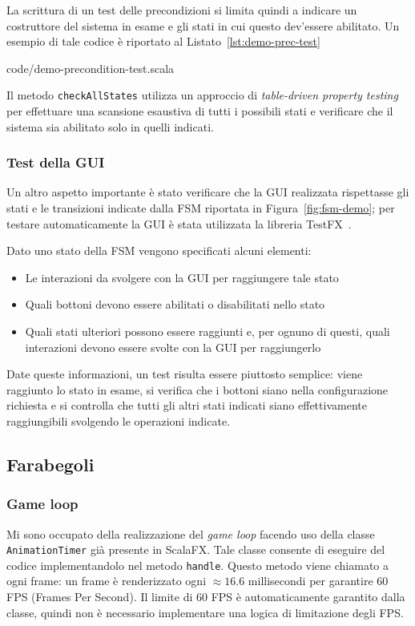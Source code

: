 La scrittura di un test delle precondizioni si limita quindi a indicare un costruttore del sistema in esame e
gli stati in cui questo dev'essere abilitato.
Un esempio di tale codice è riportato al Listato~\ref{lst:demo-prec-test}


{code/demo-precondition-test.scala}

Il metodo \texttt{checkAllStates} utilizza un approccio di \textit{table-driven property testing} per effettuare
una scansione esaustiva di tutti i possibili stati e verificare che il sistema sia abilitato solo in quelli indicati.

\subsubsection{Test della GUI}
Un altro aspetto importante è stato verificare che la GUI realizzata rispettasse gli stati e le transizioni indicate
dalla FSM riportata in Figura~\ref{fig:fsm-demo};
per testare automaticamente la GUI è stata utilizzata la libreria TestFX~\cite{testfx}.

Dato uno stato della FSM vengono specificati alcuni elementi:
\begin{itemize}
    \item Le interazioni da svolgere con la GUI per raggiungere tale stato
    \item Quali bottoni devono essere abilitati o disabilitati nello stato
    \item Quali stati ulteriori possono essere raggiunti e, per ognuno di questi, quali interazioni devono essere svolte
    con la GUI per raggiungerlo
\end{itemize}
Date queste informazioni, un test risulta essere piuttosto semplice: viene raggiunto lo stato in esame, si verifica che
i bottoni siano nella configurazione richiesta e si controlla che tutti gli altri stati indicati siano effettivamente
raggiungibili svolgendo le operazioni indicate.

\subsection{Farabegoli}\label{subsec:demo-farabegoli}
\subsubsection{Game loop}
Mi sono occupato della realizzazione del \textit{game loop} facendo uso della classe \texttt{AnimationTimer} già
presente in ScalaFX\@.
Tale classe consente di eseguire del codice implementandolo nel metodo \texttt{handle}.
Questo metodo viene chiamato a ogni frame: un frame è renderizzato ogni $\approx16.6$ millisecondi per garantire 60 FPS
(Frames Per Second).
Il limite di 60 FPS è automaticamente garantito dalla classe, quindi non è necessario implementare una logica
di limitazione degli FPS\@.

